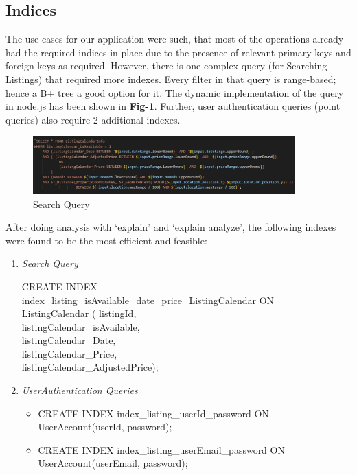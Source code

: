 \documentclass[conference]{IEEEtran}
\begin{document}
    \subsection{\textbf{Indices}}
        The use-cases for our application were such, that most of the operations already had the required indices in place due to the presence of relevant primary keys and foreign keys as required.
However, there is one complex query (for Searching Listings) that required more indexes. Every filter in that query is range-based; hence a B+ tree a good option for it. The dynamic implementation of the query in node.js has been shown in \textbf{Fig-\ref{fig_6}}.
Further, user authentication queries (point queries) also require 2 additional indexes.
        \begin{figure}[t]
            \centering
            \includegraphics[width=0.9\textwidth]{../Directly_As_Images/SearchQuery.JPG}
            \caption{Search Query} \label{fig_6}
        \end{figure}

        After doing analysis with ‘explain’ and ‘explain analyze’, the following indexes were found to be the most efficient and feasible:
	\begin{enumerate}
		\item \textit{Search Query}
  
		            CREATE INDEX\\
		            index\_listing\_isAvailable\_date\_price\_ListingCalendar ON\\ 
			     ListingCalendar ( listingId, \\
                  listingCalendar\_isAvailable,\\
				 listingCalendar\_Date,\\
				 listingCalendar\_Price,\\
				listingCalendar\_AdjustedPrice);

		\item \textit{UserAuthentication Queries}
			\begin{itemize}
                    			\item CREATE INDEX index\_listing\_userId\_password ON UserAccount(userId, password);
				\item CREATE INDEX index\_listing\_userEmail\_password ON UserAccount(userEmail, password);
			\end{itemize}
	\end{enumerate}
\end{document}

